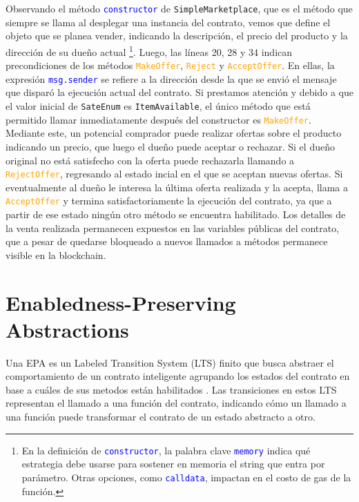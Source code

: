 Observando el método \textcolor{blue}{\texttt{constructor}} de \texttt{SimpleMarketplace}, que es el método que siempre se llama al desplegar una instancia del contrato, vemos que define el objeto que se planea vender, indicando la descripción, el precio del producto y la dirección de su dueño actual \footnote{En la definición de \textcolor{blue}{\texttt{constructor}}, la palabra clave \textcolor{blue}{\texttt{memory}} indica qué estrategia debe usarse para sostener en memoria el string que entra por parámetro. Otras opciones, como \textcolor{blue}{\texttt{calldata}}, impactan en el costo de gas de la función.}.
Luego, las líneas 20, 28 y 34 indican precondiciones de los métodos \textcolor{orange}{\texttt{MakeOffer}}, \textcolor{orange}{\texttt{Reject}} y \textcolor{orange}{\texttt{AcceptOffer}}.
En ellas, la expresión \textcolor{blue}{\texttt{msg.sender}} se refiere a la dirección desde la que se envió el mensaje que disparó la ejecución actual del contrato.
Si prestamos atención y debido a que el valor inicial de \texttt{SateEnum} es \texttt{ItemAvailable}, el único método que está permitido llamar inmediatamente después del constructor es \textcolor{orange}{\texttt{MakeOffer}}.
Mediante este, un potencial comprador puede realizar ofertas sobre el producto indicando un precio, que luego el dueño puede aceptar o rechazar.
Si el dueño original no está satisfecho con la oferta puede rechazarla llamando a \textcolor{orange}{\texttt{RejectOffer}}, regresando al estado incial en el que se aceptan nuevas ofertas.
Si eventualmente al dueño le interesa la última oferta realizada y la acepta, llama a \textcolor{orange}{\texttt{AcceptOffer}} y termina satisfactoriamente la ejecución del contrato, ya que
a partir de ese estado ningún otro método se encuentra habilitado. Los detalles de la venta realizada permanecen expuestos en las variables públicas del contrato, que a pesar de quedarse bloqueado a nuevos llamados a métodos permanece visible en la blockchain.


\section{Enabledness-Preserving Abstractions}


Una EPA es un Labeled Transition System (LTS) finito que busca abstraer el comportamiento de un contrato inteligente agrupando los estados del contrato en base a cuáles de sus metodos están habilitados \cite{de-caso-epa}.
Las transiciones en estos LTS representan el llamado a una función del contrato, indicando cómo un llamado a una función puede transformar el contrato de un estado abstracto a otro.

